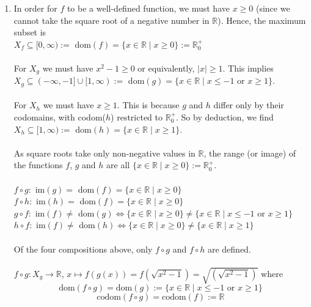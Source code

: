 \documentclass[12pt]{amsart}
\begin{document}
\begin{enumerate}
\begin{enumerate}
		\end{enumerate}
		\medskip
	\item 
		In order for $f$ to be a well-defined function, we must have $x \ge 0$ (since we cannot take the 			square root of a negative number in $\mathbb{R}$). Hence, the maximum subset is\\
		$X_f \subseteq [0,\infty) :=$ dom$(f) = \{x \in \mathbb{R}  \mid x \ge 0\} := \mathbb{R}^+_0$ \\
		\\For $X_g$ we must have $x^2-1 \ge 0$ or equivalently, $|x| \ge 1$. This implies\\
		$X_g \subseteq (-\infty,-1] \cup [1,\infty) :=$ dom$(g) = \{x \in \mathbb{R} \mid x \le -1$ or $x \ge 1\}$.
		\\
		\\
		For $X_h$ we must have $x \ge 1$. This is because $g$ and $h$ differ only by their codomains, 			with codom($h$) restricted to $\mathbb{R}^+_0$. So by deduction, we find
		\\
		$X_h \subseteq [1,\infty) :=$ dom$(h)=\{x \in \mathbb{R} \mid x \ge 1\}$.\\
		\\
		As square roots take only non-negative values in $\mathbb{R}$, the range (or image) of 	the				functions $f$, $g$ and $h$ are all $ \{x \in \mathbb{R}  \mid x \ge 0\} := \mathbb{R}^+_0$.
		\\
		\\$f\circ g : $ im$(g) =$ dom$(f) = \{x \in \mathbb{R} \mid x \ge 0\}$\\
		$f\circ h : $ im$(h) =$ dom$(f) = \{x \in \mathbb{R} \mid x \ge 0\}$\\
		$g\circ f : $ im$(f) \ne $ dom$(g) \Leftrightarrow \{x \in \mathbb{R} \mid x \ge 0\} \ne 
		\{x \in \mathbb{R} \mid x \le -1$ or $x \ge 1\}$\\
		$h \circ f : $ im$(f) \ne $ dom$(h) \Leftrightarrow \{x \in \mathbb{R} \mid x \ge 0\} \ne
		\{x \in \mathbb{R} \mid x \ge 1\}$\\
		\\
		Of the four compositions above, only $f\circ g$ and $f\circ h$ are defined.\\ 
		\\
		$f\circ g : X_g \rightarrow  \mathbb{R}$, \text{ } $x \mapsto f(g(x))= f(\sqrt{x^2-1})=
		\sqrt{\left(\sqrt{x^2-1}\right)} \text{ where }$\\
		$$\text{dom}(f \circ g) = \text{dom}(g) := \{x \in \mathbb{R} \mid x \le -1 \text{ or } x \ge 1\}$$
		$$\text{codom}(f \circ g) = \text{codom}(f) := \mathbb{R}$$

\end{enumerate}
\end{document}
